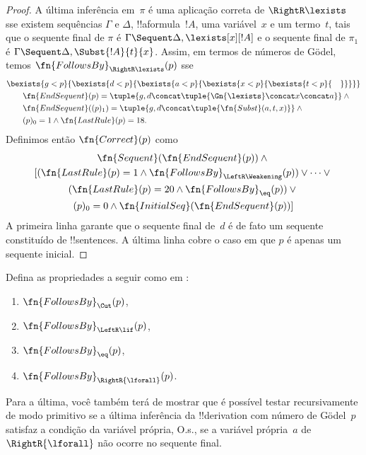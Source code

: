 \documentclass[../../../include/open-logic-section]{subfiles}
\begin{document}
\begin{proof}
A última inferência em~$\pi$ é uma aplicação correta de
$\RightR\lexists$ sse existem sequências $\Gamma$ e $\Delta$,
!!a{formula}~$!A$, uma variável~$x$ e um termo~$t$, tais que o sequente
final de $\pi$ é $\Gamma \Sequent \Delta, \lexists[x][!A]$ e o
sequente final de $\pi_1$ é
$\Gamma \Sequent \Delta, \Subst{!A}{t}{x}$. Assim, em termos de números
de G\"odel, temos $\fn{FollowsBy}_{\RightR\lexists}(p)$ sse
\begin{align*}
  & \bexists{g<p}{\bexists{d<p}{\bexists{a<p}{\bexists{x<p}{\bexists{t<p}{\quad}}}}}\\
  & \qquad \fn{EndSequent}(p) = 
  \tuple{
    g,
    d \concat \tuple{\Gn{\lexists} \concat x \concat a}
  } \land {}\\
  & \qquad \fn{EndSequent}((p)_1) = 
  \tuple{
    g,
    d \concat \tuple{\fn{Subst}(a, t, x)}
  } \land {}\\
  & \qquad (p)_0 = 1 \land \fn{LastRule}(p) = 18.
\end{align*}
Definimos então $\fn{Correct}(p)$ como
\begin{multline*}
  \fn{Sequent}(\fn{EndSequent}(p)) \land {}\\ 
  [(\fn{LastRule}(p) = 1 \land 
  \fn{FollowsBy}_{\LeftR\Weakening}(p)) \lor \dots \lor {}\\
  (\fn{LastRule}(p) = 20 \land \fn{FollowsBy}_{\eq}(p)) \lor {}\\
  (p)_0 = 0 \land \fn{InitialSeq}(\fn{EndSequent}(p))]
\end{multline*}
A primeira linha garante que o sequente final de~$d$ é de fato um
sequente constituído de !!{sentence}s. A última linha cobre o caso em
que $p$ é apenas um sequente inicial.
\end{proof}

\begin{prob}
  Defina as propriedades a seguir como em
  :
  \begin{enumerate}
  \item $\fn{FollowsBy}_{\Cut}(p)$,
  \item $\fn{FollowsBy}_{\LeftR\lif}(p)$,
  \item $\fn{FollowsBy}_{\eq}(p)$,
  \item $\fn{FollowsBy}_{\RightR{\lforall}}(p)$.
  \end{enumerate}
  Para a última, você também terá de mostrar que é possível testar
  recursivamente de modo primitivo se a última inferência da
  !!{derivation} com número de G\"odel~$p$ satisfaz a condição da
  variável própria, O.s.\@, se a variável própria~$a$ de
  $\RightR{\lforall}$ não ocorre no sequente final.
  \end{prob}
  
\end{document}
